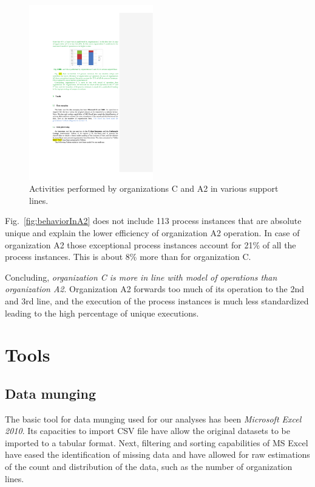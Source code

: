 \documentclass[lnbip]{svmultln}
\begin{document}
\begin{figure}
  \vspace{-10pt}
  \begin{center}
    \includegraphics[width=0.48\textwidth]{"figs/pic 38"}
  \end{center}
  \caption{Activities performed by organizations C and A2 in various support lines.}
  \label{fig:CandA2}
  \vspace{-20pt}
\end{figure}

Fig.~\ref{fig:behaviorInA2} does not include 113 process instances that are absolute unique and explain the lower efficiency of organization A2 operation. In case of organization A2 those exceptional process instances account for 21\% of all the process instances. This is about 8\% more than for organization C.

Concluding, \emph{organization C is more in line with model of operations than organization A2}. Organization A2 forwards too much of its operation to the 2nd and 3rd line, and the execution of the process instances is much less standardized leading to the high percentage of unique executions.

\section{Tools}
\label{sec:tools}
\subsection{Data munging}
The basic tool for data munging used for our analyses has been \emph{Microsoft Excel 2010}. Its capacities to import CSV file have allow the original datasets to be imported to a tabular format. Next, filtering and sorting capabilities of MS Excel have eased the identification of missing data and have allowed for raw estimations of the count and distribution of the data, such as the number of organization lines. 
\end{document}

